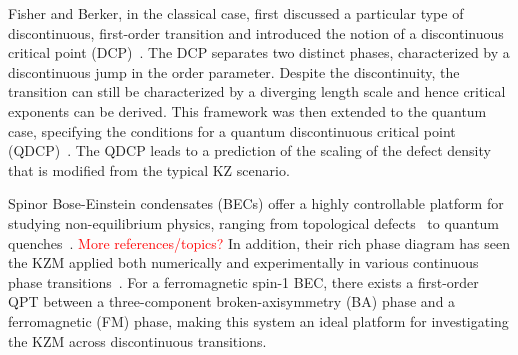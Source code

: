 Fisher and Berker, in the classical case, first discussed a particular type of
discontinuous, first-order transition and introduced the notion of a
discontinuous critical point (DCP)~\cite{Fisher1982}.
The DCP separates two distinct phases, characterized by a discontinuous jump
in the order parameter.
Despite the discontinuity, the transition can still be characterized by a
diverging length scale and hence critical exponents can be derived.
This framework was then extended to the quantum case, specifying the conditions
for a quantum discontinuous critical point (QDCP)~\cite{Suzuki2015}.
The QDCP leads to a prediction of the scaling of the defect density that is
modified from the typical KZ scenario.

Spinor Bose-Einstein condensates (BECs) offer a highly controllable platform
for studying non-equilibrium physics, ranging from topological
defects~\cite{Lovegrove2014, Borgh2016} to quantum
quenches~\cite{Symes2017, Prufer2018, Schmied2019}.
\textcolor{red}{More references/topics?}
In addition, their rich phase diagram has seen the KZM applied both numerically
and experimentally in various continuous phase transitions~\cite{Damski2007,
    Saito2007, Saito2007a, Swislocki2013, Witkowska2013, Anquez2016}.
For a ferromagnetic spin-1 BEC, there exists a first-order QPT between a
three-component broken-axisymmetry (BA) phase and a ferromagnetic (FM) phase,
making this system an ideal platform for investigating the KZM across
discontinuous transitions.

